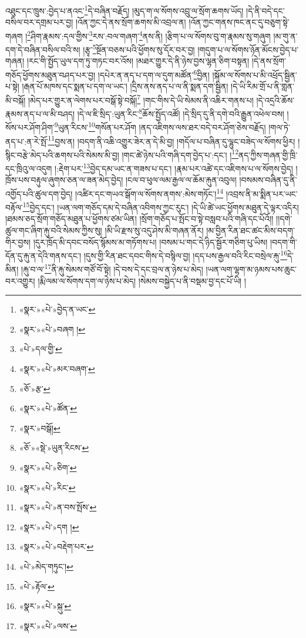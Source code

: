 འཐུང་དང་ཁྲུས་:བྱེད་པ་ནའང་\footnote{«སྣར་»«པེ་»བྱེད་ན་ཡང་}དེ་བཞིན་བརྗོད། །མུད་ག་ལ་སོགས་འབྲུ་ལ་སྲོག་ཆགས་ཡོད། །དེ་ནི་བདེ་དང་བསིལ་བར་དགྲམ་པར་བྱ། །འོན་ཀྱང་དེ་ནས་སྲོག་ཆགས་མི་འབྲལ་ན། །འོན་ཀྱང་གནས་ཁང་ནང་དུ་བཅུག་སྟེ་གཞག །\footnote{«སྣར་»«པེ་»བཞག །}ཤིག་རྣམས་:དལ་གྱིས་\footnote{«པེ་»དལ་གྱི་}རས་:བལ་གཞག་\footnote{«སྣར་»«པེ་»མར་བཞག་}ནས་ནི། །རྩིག་པ་ལ་སོགས་བུ་ག་རྣམས་སུ་གཞུག །མ་གུ་ན་དག་དེ་བཞིན་བསིལ་བའི་ས། །རྩྭ་\footnote{«ཅོ་»རྩ་}སྔོན་བཅས་པའི་ཕྱོགས་སུ་དོར་བར་བྱ། །གདུག་པ་ལ་སོགས་ཉོན་མོངས་བྱེད་པ་གཞན། །རང་གི་སྤྱོད་ཡུལ་དག་ཏུ་གཏང་བར་འོས། །མཐར་གྱུར་དེ་ནི་ཉེས་བྱས་ལྷན་ཅིག་བསྟན། །དེ་ནས་སྲོག་གཅོད་ཕྱོགས་མཐུན་བཤད་པར་བྱ། །དཔེར་ན་ནད་པ་དག་ལ་དུག་མཚོན་\footnote{«སྣར་»«པེ་»ཚོན་}བྱིན། །སྐོམ་ལ་སོགས་པ་མི་འཕྲོད་སྦྱིན་པ་སྟེ། །རྒན་པོ་མཁས་དང་སྨན་པ་དག་ལ་ཡང་། །དྲིས་ནས་ནད་པ་ལ་ནི་སྨན་དག་སྦྱིན། །དེ་ཡི་རིམ་གྲོ་པ་ནི་གླན་མི་བསྐོ། །མེད་པར་གྱུར་ན་ལེགས་པར་བསྒོ་སྟེ་བསྐོ།\footnote{«སྣར་»བསྒོ།} །གང་གིས་དེ་ཡི་སེམས་ནི་འཆིར་གནས་པ། །དེ་འདྲའི་ཆོས་རྣམས་ནད་པ་ལ་མི་བཤད། །དེ་ལ་ཇི་སྲིད་:ཡུན་རིང་\footnote{«ཅོ་»«སྡེ་»ཡུན་རིངས་}ཆོས་སྤྱོད་འཚོ། །དེ་སྲིད་དུ་ནི་དགེ་བའི་རྒྱུན་འཕེལ་བས། །སོས་པར་ཤོག་ཤིག་\footnote{«སྣར་»«པེ་»ཅིག་}ཡུན་རིངས་\footnote{«སྣར་»«པེ་»རིང་}གསོན་པར་ཤོག །ནད་འཇིགས་ལས་ཐར་བདེ་བར་ཤོག་ཅེས་བརྗོད། །གལ་ཏེ་ནད་པ་:ན་རེ་སྤོ་\footnote{«སྣར་»«པེ་»ན་བས་སྤོས་}བྱས་ན། །བདག་ནི་འཆི་འགྱུར་ཟེར་ན་དེ་མི་བྱ། །གདོལ་པ་བཞིན་དུ་ལྷུང་བཟེད་ལ་སོགས་ཕྱིར། །སྙིང་བརྩེ་མེད་པའི་ཆགས་པའི་སེམས་མི་བྱ། །གང་ཚེ་ཉེས་པའི་གཞི་དག་བྱེད་པ་:དང་། །\footnote{«སྣར་»«པེ་»དག །}ནད་ཀྱིས་གཞན་གྱི་ཁྲི་དང་ཁྲིའུ་ལ་འདུག །:རྡེག་པར་\footnote{«སྣར་»«པེ་»བརྡེག་པར་}བྱེད་དམ་ཡང་ན་གཟས་པ་དང་། །རྣམ་པར་འཚེ་དང་འཇིགས་པ་ལ་སོགས་བྱེད། །ཁྲོས་པས་བརྟུལ་ཞུགས་ཅན་ལ་ཟན་མེད་བྱེད། །ངལ་བ་ཕུལ་ལམ་རྒྱལ་ལ་ཆོམ་རྐུན་འབུལ། །བསམས་བཞིན་དུ་ནི་འགྱོད་པའི་ཚུལ་དག་བྱེད། །འཚིར་དང་གཡའ་སྒོག་ལ་སོགས་ནགས་:མེས་གཏོང་།\footnote{«པེ་»མེད་གཏུང་།} །འབྲས་ནི་མ་སྨིན་པར་ཡང་བརྟོལ་\footnote{«པེ་»རྟོལ་}བྱེད་དང་། །ཡན་ལག་གཅོད་དམ་དེ་བཞིན་འབིགས་ཀྱང་རུང་། །དེ་ཡི་ཚེ་ཡང་ཕྱོགས་མཐུན་དེ་ལྟར་འདིར། །ཐམས་ཅད་སྲོག་གཅོད་མཐུན་པ་ཕྱོགས་ཙམ་ཡིན། །སྲོག་གཅོད་པ་སྤོང་བ་སྟེ་བསླབ་པའི་གཞི་དང་པོའོ།། །།དགེ་ཚུལ་གང་ཞིག་རྐུ་བའི་སེམས་ཀྱིས་སུ། །མི་ཡི་རྫས་སུ་འདུ་ཤེས་མི་གཞན་ནོར། །མ་བྱིན་རིན་ཐང་ཚང་མིས་བདག་གིར་བྱས། །དུར་ཁྲོད་མི་དབང་བསོད་སྙོམས་མ་གཏོགས་པ། །བསམ་པ་གང་དེ་ཉིད་སྦྱོར་གཅིག་པུ་ཡིས། །བདག་གི་དོན་དུ་རྐུ་ན་དེའི་གནས་དང་། །དུས་གྱི་རིན་ཐང་དབང་གིས་དེ་བསྙིལ་བྱ། །དད་པས་རྒྱལ་བའི་རིང་བསྲེལ་རྐུ་\footnote{«སྣར་»«པེ་»སྐུ་}དེ་མིན། །རྐུ་བ་ལ་\footnote{«སྣར་»«པེ་»ལས་}ནི་རྐུ་སེམས་གཙོ་བོ་སྟེ། །དེ་བས་དེ་དང་བྲལ་ན་ཉེས་པ་མེད། །ཡན་ལག་ལྷག་མ་ཉམས་པས་ཆུང་བར་འགྱུར། །རྨི་ལམ་ལ་སོགས་དག་ལ་ཉེས་པ་མེད། །སེམས་བསྐྱེད་པ་ནི་བསྡམ་བྱ་དང་པོ་ཡི། །
